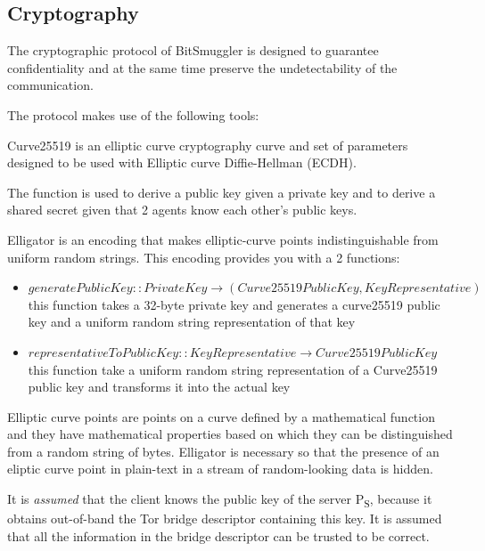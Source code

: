\documentclass[11pt]{book} %
\newcommand{\projectName}{BitSmuggler }
\begin{document}
\subsection{Cryptography}
\label{subsec:crypto}
\label{subsec:cryptoProtocol}
The cryptographic protocol of \projectName is designed to guarantee confidentiality and at the same time preserve the undetectability of the communication.

The protocol makes use of the following tools:


Curve25519 is an elliptic curve cryptography curve and set of parameters designed to be used with Elliptic curve Diffie-Hellman (ECDH).

The function is used to derive a public key given a private key and to derive a shared secret given that 2 agents know each other's public keys.


Elligator is an encoding that makes elliptic-curve points indistinguishable from uniform random strings. This encoding provides you with a 2 functions: 
\begin{itemize}
\item \( generatePublicKey :: PrivateKey \rightarrow (Curve25519PublicKey, KeyRepresentative) \)
this function takes a 32-byte private key and generates a curve25519 public key and a uniform random string representation of that key
\item \(representativeToPublicKey :: KeyRepresentative \rightarrow Curve25519PublicKey  \)
this function take a uniform random string representation of a Curve25519 public key and transforms it into the actual key
\end{itemize}

Elliptic curve points are points on a curve defined by a mathematical function and they have mathematical properties based on which they can be distinguished from a random string of bytes. Elligator is necessary so that the presence of an eliptic curve point in plain-text in a stream of random-looking data is hidden.





 It is \textit{assumed} that the client knows the public key of the server P\textsubscript{S}, because it obtains out-of-band the Tor bridge descriptor containing this key. It is assumed that all the information in the bridge descriptor can be trusted to be correct.
\end{document}
